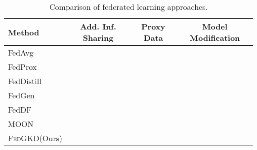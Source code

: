 \documentclass{article} %
\newcommand{\cmark}{\ding{51}}%
\newcommand{\xmark}{\ding{55}}%
\newcommand{\system}{\textsc{FedGKD}\xspace}
\begin{document}
\begin{table}[!t]
\centering
\caption{Comparison of federated learning approaches.}
\renewcommand\arraystretch{1.1}

\begin{tabular}{lccc}%
\toprule
\textbf{Method}  & \textbf{{Add. Inf. Sharing}} & \textbf{{Proxy Data}} & \textbf{{Model Modification}}  \\
\hline
  FedAvg~\citep{mcmahan2017communication}  & \xmark & \xmark & \xmark \\
  FedProx~\citep{li2018federated}  & \xmark & \xmark & \xmark\\
  FedDistill~\citep{seo2020federated} & \cmark & \xmark & \xmark\\
  FedGen~\citep{zhu2021data} & \cmark & \xmark & \xmark \\
  FedDF~\citep{lin2020ensemble} & \xmark & \cmark & \xmark \\
  MOON~\citep{li2021model}  & \xmark & \xmark & \cmark\\
  \system (Ours) & \xmark & \xmark & \xmark \\
  \bottomrule
  \end{tabular}
 \label{tbl:alg_comp}
\end{table}
\end{document}
